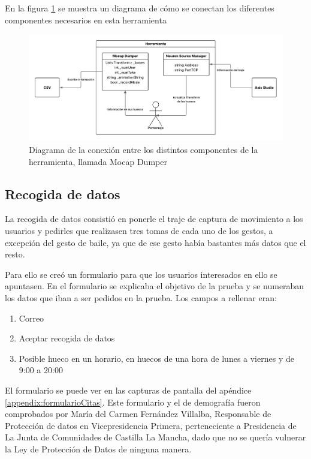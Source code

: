 En la figura \ref{fig:MocapDumper} se muestra un diagrama de cómo se conectan los diferentes componentes necesarios en esta herramienta

\begin{figure}[H]
	\centering
	\includegraphics[width=1\textwidth]{Imagenes/Vectorial/MocapDumper.pdf}
	\caption{Diagrama de la conexión entre los distintos componentes de la herramienta, llamada Mocap Dumper}
	\label{fig:MocapDumper}
\end{figure}

\subsection{Recogida de datos}
La recogida de datos consistió en ponerle el traje de captura de movimiento a los usuarios y pedirles que realizasen tres tomas de cada uno de los gestos, a excepción del gesto de baile, ya que de ese gesto había bastantes más datos que el resto.

Para ello se creó un formulario para que los usuarios interesados en ello se apuntasen. En el formulario se explicaba el objetivo de la prueba y se numeraban los datos que iban a ser pedidos en la prueba. Los campos a rellenar eran:

\begin{enumerate}
	\item Correo
	\item Aceptar recogida de datos
	\item Posible hueco en un horario, en huecos de una hora de lunes a viernes y de 9:00 a 20:00
\end{enumerate}

El formulario se puede ver en las capturas de pantalla del apéndice \ref{appendix:formularioCitas}. Este formulario y el de demografía fueron comprobados por María del Carmen Fernández Villalba, Responsable de Protección de datos en Vicepresidencia Primera, perteneciente a Presidencia de La Junta de Comunidades de Castilla La Mancha, dado que no se quería vulnerar la Ley de Protección de Datos de ninguna manera.

